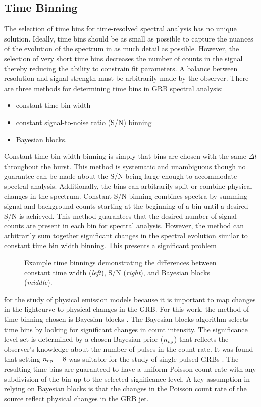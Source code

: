 \subsection{Time Binning}
\label{sec:tbin}
The selection of time bins for time-resolved spectral analysis has no
unique solution. Ideally, time bins should be as small as possible to
capture the nuances of the evolution of the spectrum in as much detail
as possible. However, the selection of very short time bins decreases
the number of counts in the signal thereby reducing the ability to
constrain fit parameters. A balance between resolution and signal
strength must be arbitrarily made by the observer. There are three
methods for determining time bins in GRB spectral analysis:
\begin{itemize}
\item constant time bin width
\item constant signal-to-noise ratio (S/N) binning
\item Bayesian blocks.
\end{itemize}
Constant time bin width binning is simply that bins are chosen with
the same $\Delta t$ throughout the burst. This method is systematic
and unambiguous though no guarantee can be made about the S/N being
large enough to accommodate spectral analysis. Additionally, the bins
can arbitrarily split or combine physical changes in the
spectrum. Constant S/N binning combines spectra by summing signal and
background counts starting at the beginning of a bin until a desired
S/N is achieved. This method guarantees that the desired number of
signal counts are present in each bin for spectral analysis. However,
the method can arbitrarily sum together significant changes in the
spectral evolution similar to constant time bin width binning. This
presents a significant problem
\begin{figure}[h]
  \centering
\caption{Example time binnings demonstrating the differences between
  constant time width (\emph{left}), S/N (\emph{right}), and Bayesian
  blocks (\emph{middle}).}
  \label{fig:binmeth}
\end{figure}
for the study of physical emission models because it is important to
map changes in the lightcurve to physical changes in the GRB.  For
this work, the method of time binning chosen is Bayesian blocks
\cite{Scargle:2013}. The Bayesian blocks algorithm selects time bins
by looking for significant changes in count intensity. The
significance level set is determined by a chosen Bayesian prior
($n_{\rm cp}$) that reflects the observer's knowledge about the number
of pulses in the count rate. It was found that setting $n_{\rm cp}=8$
was suitable for the study of single-pulsed GRBs
\cite{Scargle:2013}. The resulting time bins are guaranteed to have a
uniform Poisson count rate with any subdivision of the bin up to
the selected significance level. A key assumption in relying on
Bayesian blocks is that the changes in the Poisson count rate of the
source reflect physical changes in the GRB jet.



